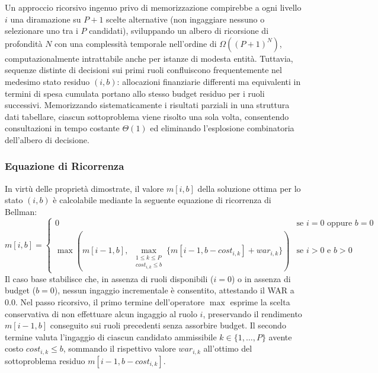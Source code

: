 Un approccio ricorsivo ingenuo privo di memorizzazione compirebbe a ogni livello $i$ una diramazione su $P + 1$ scelte alternative (non ingaggiare nessuno o selezionare uno tra i $P$ candidati), sviluppando un albero di ricorsione di profondità $N$ con una complessità temporale nell'ordine di $\Omega((P + 1)^N)$, computazionalmente intrattabile anche per istanze di modesta entità. Tuttavia, sequenze distinte di decisioni sui primi ruoli confluiscono frequentemente nel medesimo stato residuo $(i, b)$: allocazioni finanziarie differenti ma equivalenti in termini di spesa cumulata portano allo stesso budget residuo per i ruoli successivi. Memorizzando sistematicamente i risultati parziali in una struttura dati tabellare, ciascun sottoproblema viene risolto una sola volta, consentendo consultazioni in tempo costante $\Theta(1)$ ed eliminando l'esplosione combinatoria dell'albero di decisione.

\subsubsection{Equazione di Ricorrenza}
In virtù delle proprietà dimostrate, il valore $m[i, b]$ della soluzione ottima per lo stato $(i, b)$ è calcolabile mediante la seguente equazione di ricorrenza di Bellman:
\begin{equation}
	m[i, b] = \begin{cases}
		0 & \text{se } i = 0 \text{ oppure } b = 0                       \\
		\max \left( m[i - 1, b], \; \max\limits_{\substack{1 \le k \le P \\ \mathit{cost}_{i, k} \le b}} \{ m[i - 1, b - \mathit{cost}_{i, k}] + \mathit{war}_{i, k} \} \right) & \text{se } i > 0 \text{ e } b > 0
	\end{cases}
	\label{eq:bellman}
\end{equation}
Il caso base stabilisce che, in assenza di ruoli disponibili ($i = 0$) o in assenza di budget ($b = 0$), nessun ingaggio incrementale è consentito, attestando il WAR a $0.0$. Nel passo ricorsivo, il primo termine dell'operatore $\max$ esprime la scelta conservativa di non effettuare alcun ingaggio al ruolo $i$, preservando il rendimento $m[i-1, b]$ conseguito sui ruoli precedenti senza assorbire budget. Il secondo termine valuta l'ingaggio di ciascun candidato ammissibile $k \in \{1, \dots, P\}$ avente costo $\mathit{cost}_{i,k} \le b$, sommando il rispettivo valore $\mathit{war}_{i, k}$ all'ottimo del sottoproblema residuo $m[i - 1, b - \mathit{cost}_{i, k}]$.

